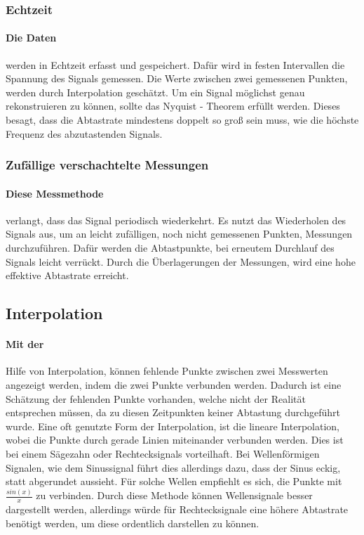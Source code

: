 \documentclass{article}
\begin{document}
\subsubsection{Echtzeit}
\paragraph{Die Daten}
werden in Echtzeit erfasst und gespeichert. Dafür wird in festen Intervallen die Spannung des Signals gemessen. Die Werte zwischen zwei gemessenen Punkten, werden durch Interpolation geschätzt. Um ein Signal möglichst genau rekonstruieren zu können, sollte das Nyquist - Theorem erfüllt werden. Dieses besagt, dass die Abtastrate mindestens doppelt so groß sein muss, wie die höchste Frequenz des abzutastenden Signals. \cite{threesystems}
\subsubsection{Zufällige verschachtelte Messungen}
\paragraph{Diese Messmethode}
verlangt, dass das Signal periodisch wiederkehrt. Es nutzt das Wiederholen des Signals aus, um an leicht zufälligen, noch nicht gemessenen Punkten, Messungen durchzuführen. Dafür werden die Abtastpunkte, bei erneutem Durchlauf des Signals leicht verrückt. Durch die Überlagerungen der Messungen, wird eine hohe effektive Abtastrate erreicht. \cite{threesystems}
\subsection{Interpolation}
\paragraph{Mit der}
Hilfe von Interpolation, können fehlende Punkte zwischen zwei Messwerten angezeigt werden, indem die zwei Punkte verbunden werden. Dadurch ist eine Schätzung der fehlenden Punkte vorhanden, welche nicht der Realität entsprechen müssen, da zu diesen Zeitpunkten keiner Abtastung durchgeführt wurde. Eine oft genutzte Form der Interpolation, ist die lineare Interpolation, wobei die Punkte durch gerade Linien miteinander verbunden werden. Dies ist bei einem Sägezahn oder Rechtecksignals vorteilhaft. Bei Wellenförmigen Signalen, wie dem Sinussignal führt dies allerdings dazu, dass der Sinus eckig, statt abgerundet aussieht. Für solche Wellen empfiehlt es sich, die Punkte mit $\displaystyle\frac{sin(x)}{x}$ zu verbinden. Durch diese Methode können Wellensignale besser dargestellt werden, allerdings würde für Rechtecksignale eine höhere Abtastrate benötigt werden, um diese ordentlich darstellen zu können.\cite{abc}
\end{document}

